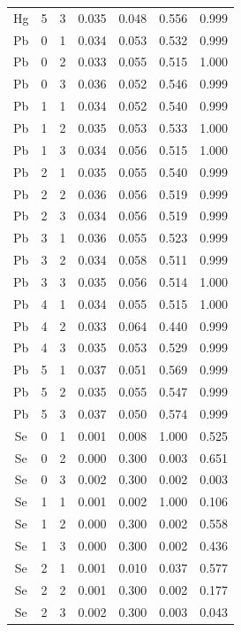 \documentclass[ms, hidelinks]{uncgdissertationexp3}
\theoremstyle{plain}
\theoremstyle{definition}
\theoremstyle{remark}
\begin{document}
\begin{longtable}{ccccccc}
  Hg & 5 & 3 & 0.035 & 0.048 & 0.556 & 0.999\\
  \rowcolor{gray!6}  Pb & 0 & 1 & 0.034 & 0.053 & 0.532 & 0.999\\
  Pb & 0 & 2 & 0.033 & 0.055 & 0.515 & 1.000\\
  \rowcolor{gray!6}  Pb & 0 & 3 & 0.036 & 0.052 & 0.546 & 0.999\\
  Pb & 1 & 1 & 0.034 & 0.052 & 0.540 & 0.999\\
  \rowcolor{gray!6}  Pb & 1 & 2 & 0.035 & 0.053 & 0.533 & 1.000\\
  Pb & 1 & 3 & 0.034 & 0.056 & 0.515 & 1.000\\
  \rowcolor{gray!6}  Pb & 2 & 1 & 0.035 & 0.055 & 0.540 & 0.999\\
  Pb & 2 & 2 & 0.036 & 0.056 & 0.519 & 0.999\\
  \rowcolor{gray!6}  Pb & 2 & 3 & 0.034 & 0.056 & 0.519 & 0.999\\
  Pb & 3 & 1 & 0.036 & 0.055 & 0.523 & 0.999\\
  \rowcolor{gray!6}  Pb & 3 & 2 & 0.034 & 0.058 & 0.511 & 0.999\\
  Pb & 3 & 3 & 0.035 & 0.056 & 0.514 & 1.000\\
  \rowcolor{gray!6}  Pb & 4 & 1 & 0.034 & 0.055 & 0.515 & 1.000\\
  Pb & 4 & 2 & 0.033 & 0.064 & 0.440 & 0.999\\
  \rowcolor{gray!6}  Pb & 4 & 3 & 0.035 & 0.053 & 0.529 & 0.999\\
  Pb & 5 & 1 & 0.037 & 0.051 & 0.569 & 0.999\\
  \rowcolor{gray!6}  Pb & 5 & 2 & 0.035 & 0.055 & 0.547 & 0.999\\
  Pb & 5 & 3 & 0.037 & 0.050 & 0.574 & 0.999\\
  \rowcolor{gray!6}  Se & 0 & 1 & 0.001 & 0.008 & 1.000 & 0.525\\
  Se & 0 & 2 & 0.000 & 0.300 & 0.003 & 0.651\\
  \rowcolor{gray!6}  Se & 0 & 3 & 0.002 & 0.300 & 0.002 & 0.003\\
  Se & 1 & 1 & 0.001 & 0.002 & 1.000 & 0.106\\
  \rowcolor{gray!6}  Se & 1 & 2 & 0.000 & 0.300 & 0.002 & 0.558\\
  Se & 1 & 3 & 0.000 & 0.300 & 0.002 & 0.436\\
  \rowcolor{gray!6}  Se & 2 & 1 & 0.001 & 0.010 & 0.037 & 0.577\\
  Se & 2 & 2 & 0.001 & 0.300 & 0.002 & 0.177\\
  \rowcolor{gray!6}  Se & 2 & 3 & 0.002 & 0.300 & 0.003 & 0.043\\

\end{longtable}
\end{document}

